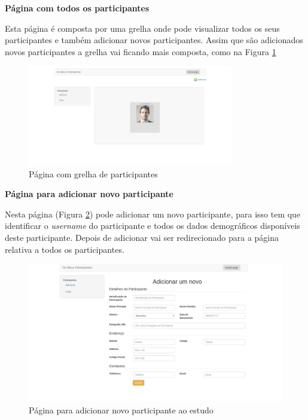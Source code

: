 \par
\textbf{Página com todos os participantes}
\par
Esta página é composta por uma grelha onde pode visualizar todos os seus participantes e também adicionar novos participantes. Assim que são adicionados novos participantes a grelha vai ficando mais composta, como na Figura \ref{f:gridParticipante}

\begin{figure}[H]
\centering
\includegraphics[width=0.8\textwidth]{imgs/list_after_add_web.png}
\caption[Página com grelha de participantes]{Página com grelha de participantes}
\label{f:gridParticipante}
\end{figure}


\par
\textbf{Página para adicionar novo participante}
\par
Nesta página (Figura \ref{f:web-newparticipante}) pode adicionar um novo participante, para isso tem que identificar o \textit{username} do participante e todos os dados demográficos disponíveis deste participante. Depois de adicionar vai ser redirecionado para a página relativa a todos os participantes. 

\begin{figure}[H]
\centering
\includegraphics[width=1\textwidth]{imgs/add_participant_web.png}
\caption[Página para adicionar novo participante ao estudo]{Página para adicionar novo participante ao estudo}
\label{f:web-newparticipante}
\end{figure}
\newpage

